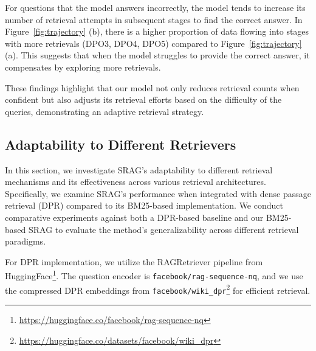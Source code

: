 For questions that the model answers incorrectly, the model tends to increase its number of retrieval attempts in subsequent stages to find the correct answer. In Figure~\ref{fig:trajectory} (b), there is a higher proportion of data flowing into stages with more retrievals (DPO3, DPO4, DPO5) compared to Figure~\ref{fig:trajectory} (a). This suggests that when the model struggles to provide the correct answer, it compensates by exploring more retrievals.

These findings highlight that our model not only reduces retrieval counts when confident but also adjusts its retrieval efforts based on the difficulty of the queries, demonstrating an adaptive retrieval strategy.



\subsection{Adaptability to Different Retrievers}






In this section, we investigate SRAG's adaptability to different retrieval mechanisms and its effectiveness across various retrieval architectures. 
Specifically, we examine SRAG's performance when integrated with dense passage retrieval (DPR) compared to its BM25-based implementation. 
We conduct comparative experiments against both a DPR-based baseline and our BM25-based SRAG to evaluate the method's generalizability across different retrieval paradigms.


For DPR implementation, we utilize the RAGRetriever pipeline from HuggingFace\footnote{\url{https://huggingface.co/facebook/rag-sequence-nq}}. The question encoder is \texttt{facebook/rag-sequence-nq}, and we use the compressed DPR embeddings from \texttt{facebook/wiki\_dpr}\footnote{\url{https://huggingface.co/datasets/facebook/wiki_dpr}} for efficient retrieval.


